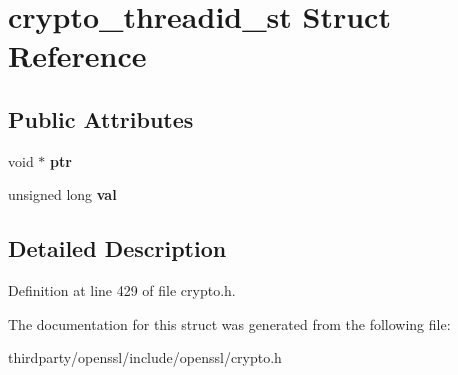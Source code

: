 \hypertarget{structcrypto__threadid__st}{}\section{crypto\+\_\+threadid\+\_\+st Struct Reference}
\label{structcrypto__threadid__st}
\subsection*{Public Attributes}
\begin{DoxyCompactItemize}
\item 
\mbox{\label{structcrypto__threadid__st_a682e95abcf3ddb87da11e9d64dc04e71}} 
void $\ast$ {\bfseries ptr}
\item 
\mbox{\label{structcrypto__threadid__st_ae211eb79aaff1a57eba548fb6fda0e2a}} 
unsigned long {\bfseries val}
\end{DoxyCompactItemize}


\subsection{Detailed Description}


Definition at line 429 of file crypto.\+h.



The documentation for this struct was generated from the following file\+:\begin{DoxyCompactItemize}
\item 
thirdparty/openssl/include/openssl/crypto.\+h\end{DoxyCompactItemize}
